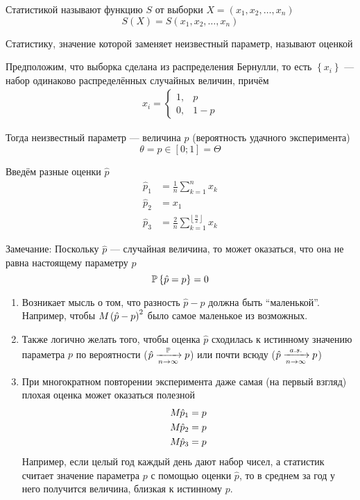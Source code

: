 \begin{definition}[Статистика]
Статистикой называют функцию $S$ от выборки $X=\left(x_1,x_2,\dots,x_n\right)$
    $$S\left(X\right)=S\left(x_1, x_2, \dots, x_n\right)$$
\end{definition}
\begin{definition}[Оценка]Статистику,
    значение которой заменяет неизвестный параметр,
    называют оценкой
\end{definition}
\begin{example}Предположим, что выборка сделана из распределения Бернулли,
    то есть $\left\{x_i\right\}$ --- набор одинаково распределённых
    случайных величин, причём
    \begin{align*}
    x_i=
    \begin{cases}
        1,&p\\
        0,&1-p
    \end{cases}
    \end{align*}

    Тогда неизвестный параметр --- величина $p$
    (вероятность удачного эксперимента)
    $$\theta=p\in\left[0;1\right]=\Theta$$

    Введём разные оценки $\hat{p}$
    \begin{align*}
        \hat{p}_1&=\frac{1}{n}\sum_{k=1}^n x_k\\
        \hat{p}_2&=x_1\\
        \hat{p}_3&=
            \frac{2}{n}\sum_{k=1}^{\left\lfloor \frac{n}{2} \right\rfloor} x_k
    \end{align*}
\end{example}
Замечание:
Поскольку $\hat{p}$ --- случайная величина, то может оказаться,
что она не равна настоящему параметру $p$
$$\mathbb{P}\left\{ \hat{p}=p \right\}=0$$
\begin{enumerate}
    \item Возникает мысль о том, что разность $\hat{p}-p$
        должна быть ``маленькой''. Например, чтобы
        $M_{} \left(\hat{p}-p\right)^2$ было самое маленькое из возможных.
    \item Также логично желать того,
        чтобы оценка $\hat{p}$ сходилась к истинному значению параметра $p$
        по вероятности ($\hat{p}\xrightarrow[n\to\infty]{\mathbb{P}} p$)
        или почти всюду ($\hat{p}\xrightarrow[n\to\infty]{a.s.} p$)
    \item При многократном повторении эксперимента
        даже самая (на первый взгляд) плохая оценка может оказаться полезной
        \begin{align*}
            M_{} \hat{p}_1=p\\
            M_{} \hat{p}_2=p\\
            M_{} \hat{p}_3=p
        \end{align*}
        Например, если целый год каждый день дают набор чисел,
        а статистик считает значение параметра $p$ с помощью оценки $\hat{p}$,
        то в среднем за год у него получится величина, близкая к истинному $p$.
\end{enumerate}

